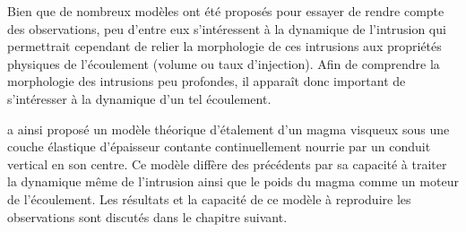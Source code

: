 Bien que de  nombreux modèles ont été proposés pour  essayer de rendre
compte des observations, peu d'entre  eux s'intéressent à la dynamique
de l'intrusion qui  permettrait cependant de relier  la morphologie de
ces  intrusions aux  propriétés physiques  de l'écoulement  (volume ou
taux d'injection).   Afin de comprendre la  morphologie des intrusions
peu  profondes,  il  apparaît  donc important  de  s'intéresser  à  la
dynamique d'un tel écoulement.

\citet{Michaut:2011kg} a ainsi proposé un modèle théorique d'étalement
d'un  magma visqueux  sous une  couche élastique  d'épaisseur contante
continuellement nourrie  par un  conduit vertical  en son  centre.  Ce
modèle diffère des  précédents par sa capacité à  traiter la dynamique
même de  l'intrusion ainsi que  le poids du  magma comme un  moteur de
l'écoulement. Les résultats  et la capacité de ce  modèle à reproduire
les observations sont discutés dans le chapitre suivant.

\newpage



